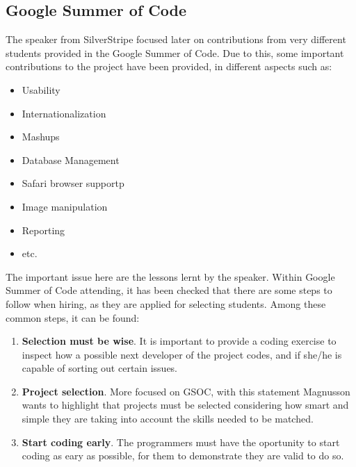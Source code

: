 \documentclass[11pt]{article}
\begin{document}
\subsection{Google Summer of Code}
The speaker from SilverStripe focused later on contributions from very different students provided in the Google Summer of Code. Due to this, some important contributions to the project have been provided, in different aspects such as:
\begin{itemize}\itemsep0pt
\item{Usability}
\item{Internationalization}
\item{Mashups}
\item{Database Management}
\item{Safari browser support}p
\item{Image manipulation}
\item{Reporting}
\item{etc.}
\end{itemize}
The important issue here are the lessons lernt by the speaker. Within Google Summer of Code attending, it has been checked that there are some steps to follow when hiring, as they are applied for selecting students. Among these common steps, it can be found:
\begin{enumerate}\itemsep0pt
\item{\textbf{Selection must be wise}}. It is important to provide a coding exercise to inspect how a possible next developer of the project codes, and if she/he is capable of sorting out certain issues.
\item{\textbf{Project selection}}. More focused on GSOC, with this statement Magnusson wants to highlight that projects must be selected considering how smart and simple they are taking into account the skills needed to be matched.
\item{\textbf{Start coding early}}. The programmers must have the oportunity to start coding as eary as possible, for them to demonstrate they are valid to do so.
\end{enumerate}
\end{document}
